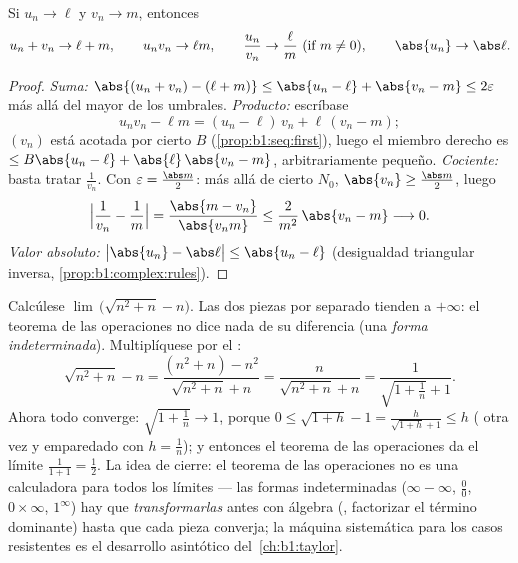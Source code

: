 \begin{theorem}\label{thm:b1:seq:operations}
Si $u_n \to \ell$ y $v_n \to m$, entonces
\[
u_n + v_n \to \ell + m, \qquad u_n v_n \to \ell m, \qquad
\frac{u_n}{v_n} \to \frac{\ell}{m} \ (\text{if } m \neq 0),
\qquad \abs{u_n} \to \abs\ell .
\]
\end{theorem}

\begin{proof}
\emph{Suma:} $\abs{(u_n + v_n) - (\ell + m)} \leq \abs{u_n - \ell} +
\abs{v_n - m} \leq 2\varepsilon$ más allá del mayor de los umbrales.
\emph{Producto:} escríbase
\[
u_n v_n - \ell m = (u_n - \ell)\,v_n + \ell\,(v_n - m);
\]
$(v_n)$ está acotada por cierto $B$ (\cref{prop:b1:seq:first}), luego
el miembro derecho es $\leq B\abs{u_n - \ell} + \abs{\ell}\,\abs{v_n -
m}$, arbitrariamente pequeño. \emph{Cociente:} basta tratar
$\frac 1{v_n}$. Con $\varepsilon = \frac{\abs m}{2}$: más allá de
cierto $N_0$, $\abs{v_n} \geq \frac{\abs m}{2}$, luego
\[
\Bigl| \frac{1}{v_n} - \frac 1m \Bigr|
= \frac{\abs{m - v_n}}{\abs{v_n m}}
\leq \frac{2}{m^2}\,\abs{v_n - m} \longrightarrow 0 .
\]
\emph{Valor absoluto:} $\bigl|\abs{u_n} - \abs\ell\bigr| \leq
\abs{u_n - \ell}$ (desigualdad triangular inversa,
\cref{prop:b1:complex:rules}).
\end{proof}

\begin{example}\label{ex:b1:seq:conjugatetrick}
Calcúlese $\lim\,\bigl(\sqrt{n^2 + n} - n\bigr)$. Las dos piezas por
separado tienden a $+\infty$: el teorema de las operaciones no dice
nada de su diferencia (una \emph{forma indeterminada}). Multiplíquese
por el :
\[
\sqrt{n^2 + n} - n
= \frac{(n^2 + n) - n^2}{\sqrt{n^2 + n} + n}
= \frac{n}{\sqrt{n^2+n} + n}
= \frac{1}{\sqrt{1 + \frac1n} + 1} .
\]
Ahora todo converge: $\sqrt{1 + \frac1n} \to 1$, porque
$0 \leq \sqrt{1 + h} - 1 = \frac{h}{\sqrt{1+h} + 1} \leq h$
( otra vez y emparedado con $h = \frac1n$); y entonces el
teorema de las operaciones da el límite $\frac{1}{1 + 1} = \frac12$.
La idea de cierre: el teorema de las operaciones no es una calculadora
para todos los límites --- las formas indeterminadas
($\infty - \infty$, $\frac00$, $0 \times \infty$, $1^\infty$) hay que
\emph{transformarlas} antes con álgebra (, factorizar el
término dominante) hasta que cada pieza converja; la máquina
sistemática para los casos resistentes es el desarrollo asintótico
del~\cref{ch:b1:taylor}.
\end{example}

